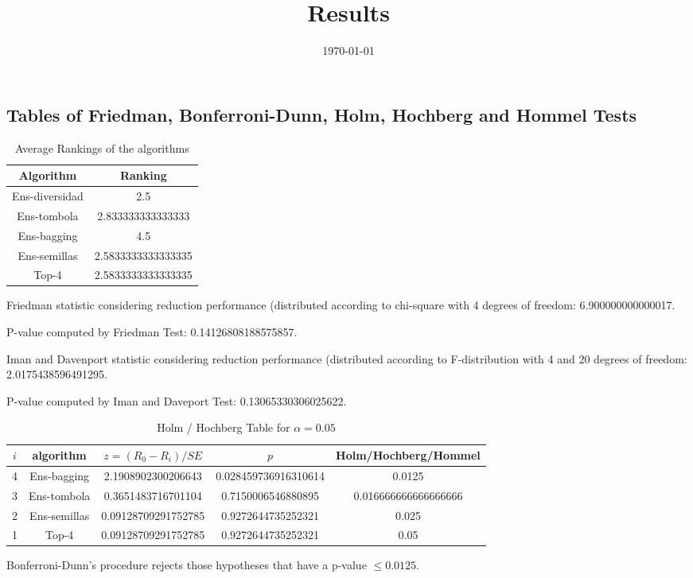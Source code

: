 \documentclass[a4paper,10pt]{article}
\title{Results}
\author{}
\date{\today}
\begin{document}
\begin{landscape}
\oddsidemargin 0in \topmargin 0in\maketitle
\section{Tables of Friedman, Bonferroni-Dunn, Holm, Hochberg and Hommel Tests}
\begin{table}[!htp]
\centering
\caption{Average Rankings of the algorithms
}\begin{tabular}{c|c}
Algorithm&Ranking\\
\hline
Ens-diversidad&2.5\\
Ens-tombola&2.833333333333333\\
Ens-bagging&4.5\\
Ens-semillas&2.5833333333333335\\
Top-4&2.5833333333333335\\
\end{tabular}
\end{table}


Friedman statistic considering reduction performance (distributed according to chi-square with 4 degrees of freedom: 6.900000000000017.


P-value computed by Friedman Test: 0.14126808188575857.\newline

Iman and Davenport statistic considering reduction performance (distributed according to F-distribution with 4 and 20 degrees of freedom: 2.0175438596491295.


P-value computed by Iman and Daveport Test: 0.13065330306025622.\newline

\begin{table}[!htp]
\centering\tiny
\caption{Holm / Hochberg Table for $\alpha=0.05$}
\begin{tabular}{ccccc}
$i$&algorithm&$z=(R_0 - R_i)/SE$&$p$&Holm/Hochberg/Hommel\\
\hline
4&Ens-bagging&2.1908902300206643&0.028459736916310614&0.0125\\
3&Ens-tombola&0.3651483716701104&0.7150006546880895&0.016666666666666666\\
2&Ens-semillas&0.09128709291752785&0.9272644735252321&0.025\\
1&Top-4&0.09128709291752785&0.9272644735252321&0.05\\
\hline
\end{tabular}
\end{table}
Bonferroni-Dunn's procedure rejects those hypotheses that have a p-value $\le0.0125$.



\end{landscape}
\end{document}
